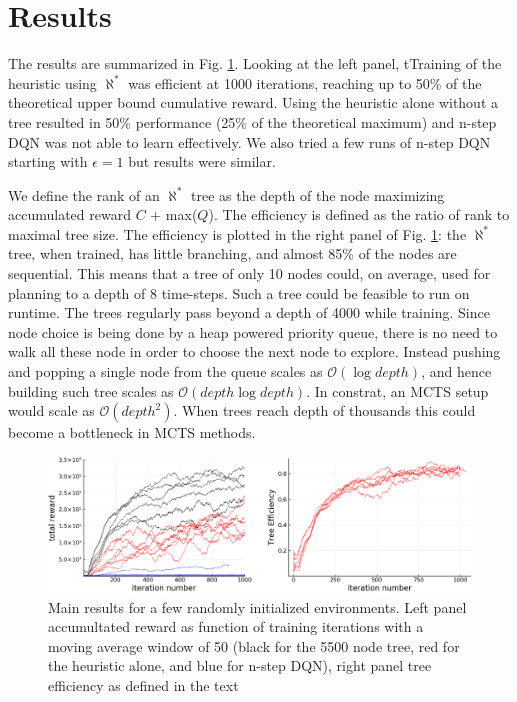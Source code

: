 \documentclass{article}
\newcommand{\alephstar}{$\aleph^*$ }
\begin{document}
\section{Results}
\label{sec:results}

The results are summarized in Fig. \ref{fig:results}. Looking at the left panel, tTraining of the heuristic using \alephstar was efficient at 1000 iterations, reaching up to 50\% of the theoretical upper bound cumulative reward. Using the heuristic alone without a tree resulted in 50\% performance (25\% of the theoretical maximum) and n-step DQN was not able to learn effectively. We also tried a few runs of n-step DQN starting with $\epsilon=1$ but results were similar.

We define the rank of an \alephstar tree as the depth of the node maximizing accumulated reward $C$ + max($Q$). The efficiency is defined as the ratio of rank to maximal tree size. The efficiency is plotted in the right panel of Fig. \ref{fig:results}: the \alephstar tree, when trained, has little branching, and almost 85\% of the nodes are sequential. This means that a tree of only 10 nodes could, on average, used for planning to a depth of 8 time-steps. Such a tree could be feasible to run on runtime. The trees regularly pass beyond a depth of 4000 while training. Since node choice is being done by a heap powered priority queue, there is no need to walk all these node in order to choose the next node to explore. Instead pushing and popping a single node from the queue scales as $\mathcal{O}(\log{depth})$, and hence building such tree scales as $\mathcal{O}(depth \log{depth})$. In constrat, an MCTS setup would scale as $\mathcal{O}(depth^2)$. When trees reach depth of thousands this could become a bottleneck in MCTS methods.

\begin{figure}[h]
  \centering
  \includegraphics[width=1.0\textwidth]{images/results.png}
  \caption{Main results for a few randomly initialized environments. Left panel accumultated reward as function of training iterations with a moving average window of 50 (black for the 5500 node tree, red for the heuristic alone, and blue for n-step DQN), right panel tree efficiency as defined in the text}
  \label{fig:results}
\end{figure}
\end{document}
